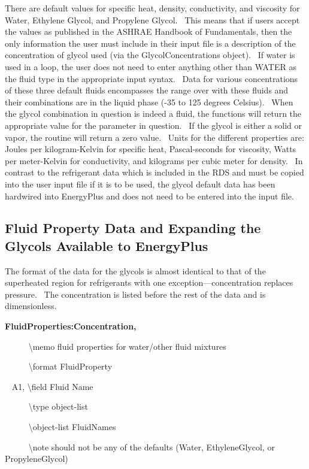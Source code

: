 There are default values for specific heat, density, conductivity, and viscosity for Water, Ethylene Glycol, and Propylene Glycol.~ This means that if users accept the values as published in the ASHRAE Handbook of Fundamentals, then the only information the user must include in their input file is a description of the concentration of glycol used (via the GlycolConcentrations object).~ If water is used in a loop, the user does not need to enter anything other than WATER as the fluid type in the appropriate input syntax.~ Data for various concentrations of these three default fluids encompasses the range over with these fluids and their combinations are in the liquid phase (-35 to 125 degrees Celsius).~ When the glycol combination in question is indeed a fluid, the functions will return the appropriate value for the parameter in question.~ If the glycol is either a solid or vapor, the routine will return a zero value.~ Units for the different properties are: Joules per kilogram-Kelvin for specific heat, Pascal-seconds for viscosity, Watts per meter-Kelvin for conductivity, and kilograms per cubic meter for density.~ In contrast to the refrigerant data which is included in the RDS and must be copied into the user input file if it is to be used, the glycol default data has been hardwired into EnergyPlus and does not need to be entered into the input file.

\subsection{Fluid Property Data and Expanding the Glycols Available to EnergyPlus}\label{fluid-property-data-and-expanding-the-glycols-available-to-energyplus}

The format of the data for the glycols is almost identical to that of the superheated region for refrigerants with one exception---concentration replaces pressure.~ The concentration is listed before the rest of the data and is dimensionless.

\textbf{FluidProperties:Concentration,}

~~~~~ \textbackslash{}memo fluid properties for water/other fluid mixtures

~~~~~ \textbackslash{}format FluidProperty

~ A1, \textbackslash{}field Fluid Name

~~~~~ \textbackslash{}type object-list

~~~~~ \textbackslash{}object-list FluidNames

~~~~~ \textbackslash{}note should not be any of the defaults (Water, EthyleneGlycol, or PropyleneGlycol)

